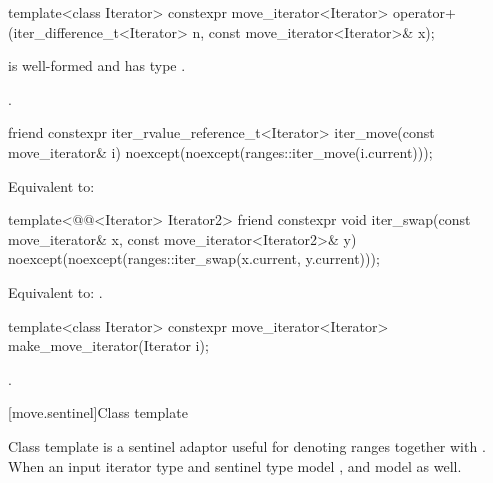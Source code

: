 %
\begin{itemdecl}
template<class Iterator>
  constexpr move_iterator<Iterator>
    operator+(iter_difference_t<Iterator> n, const move_iterator<Iterator>& x);
\end{itemdecl}

\begin{itemdescr}
\pnum
\constraints
{} is well-formed and has type .

\pnum
\returns
{}.
\end{itemdescr}

%
\begin{itemdecl}
friend constexpr iter_rvalue_reference_t<Iterator>
  iter_move(const move_iterator& i)
    noexcept(noexcept(ranges::iter_move(i.current)));
\end{itemdecl}

\begin{itemdescr}
\pnum
\effects
Equivalent to: 
\end{itemdescr}

%
\begin{itemdecl}
template<@@<Iterator> Iterator2>
  friend constexpr void
    iter_swap(const move_iterator& x, const move_iterator<Iterator2>& y)
      noexcept(noexcept(ranges::iter_swap(x.current, y.current)));
\end{itemdecl}

\begin{itemdescr}
\pnum
\effects
Equivalent to: .
\end{itemdescr}

%
\begin{itemdecl}
template<class Iterator>
  constexpr move_iterator<Iterator> make_move_iterator(Iterator i);
\end{itemdecl}

\begin{itemdescr}
\pnum
\returns
{}.
\end{itemdescr}

[move.sentinel]{Class template }

\pnum
Class template  is a sentinel adaptor useful for denoting
ranges together with . When an input iterator type
 and sentinel type  model ,
 and  model
 as well.

